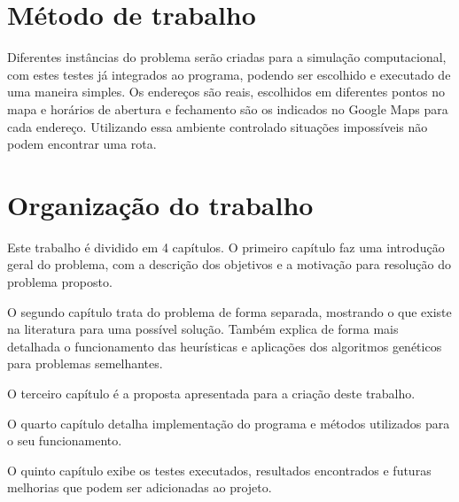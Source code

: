 \section{Método de trabalho}

Diferentes instâncias do problema serão criadas para a simulação computacional,  com estes testes já integrados ao programa, podendo ser escolhido e executado de uma maneira simples. Os endereços são reais, escolhidos em diferentes pontos no mapa e horários de abertura e fechamento são os indicados no Google Maps para cada endereço. 
Utilizando essa ambiente controlado situações impossíveis não podem encontrar uma rota.

\section{Organização do trabalho}
Este trabalho é dividido em 4 capítulos. 
O primeiro capítulo faz uma introdução geral do problema, com a descrição dos objetivos e a motivação para resolução do problema proposto.

O segundo capítulo trata do problema de forma separada, mostrando o que existe na literatura para uma possível solução. 
Também explica de forma mais detalhada o funcionamento das heurísticas e aplicações dos algoritmos genéticos para problemas semelhantes.

O terceiro capítulo é a proposta apresentada para a criação deste trabalho.

O quarto capítulo detalha implementação do programa e métodos utilizados para o seu funcionamento.

O quinto capítulo exibe os testes executados, resultados encontrados e futuras melhorias que podem ser adicionadas ao projeto.